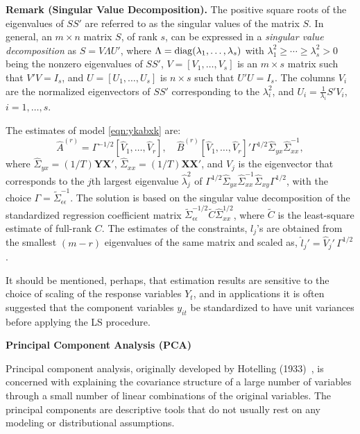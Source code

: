 \noindent\textbf{Remark (Singular Value Decomposition).} The positive square roots of the eigenvalues of $SS'$ are referred to as the singular values of the matrix $S$. In general, an $m \times n$ matrix $S$, of rank $s$, can be expressed in a \emph{singular value decomposition} as $S= V \Lambda U'$, where $\Lambda= \operatorname{diag}(\lambda_1, \ldots, \lambda_s)$ with $\lambda_1^2 \geq \cdots \geq \lambda_s^2 > 0$ being the nonzero eigenvalues of $SS'$, $V= [V_1, \ldots, V_s]$ is an $m \times s$ matrix such that $V' V= I_s$, and $U= [U_1, \ldots, U_s]$ is $n \times s$ such that $U'U= I_s$. The columns $V_i$ are the normalized eigenvectors of $SS'$ corresponding to the $\lambda_i^2$, and $U_i= \frac{1}{\lambda_i}S'V_i$, $i=1, \ldots, s$. \twomedskip


The estimates of model \eqref{eqn:ykabxk} are:
	\begin{equation} \label{eqn:covarmatrixsol}
	\hat{A}^{(r)}= \Gamma^{-1/2} [\hat{V}_1, \ldots, \hat{V}_r], \quad \hat{B}^{(r)}[ \hat{V}_1, \ldots, \hat{V}_r]' \Gamma^{1/2} \hat{\Sigma}_{yx} \hat{\Sigma}_{xx}^{-1},
	\end{equation}
where $\hat{\Sigma}_{yx}= (1/T) \mathbf{Y} \mathbf{X}'$, $\hat{\Sigma}_{xx}= (1/T) \mathbf{X} \mathbf{X}'$, and $\hat{V}_j$ is the eigenvector that corresponds to the $j$th largest eigenvalue $\hat{\lambda}_j^2$ of $\Gamma^{1/2} \hat{\Sigma}_{yx} \hat{\Sigma}_{xx}^{-1} \hat{\Sigma}_{xy}\Gamma^{1/2}$, with the choice $\Gamma= \tilde{\Sigma}_{\epsilon\epsilon}^{-1}$. The solution is based on the singular value decomposition of the standardized regression coefficient matrix $\tilde{\Sigma}_{\epsilon\epsilon}^{-1/2} \tilde{C} \hat{\Sigma}_{xx}^{1/2}$, where $\tilde{C}$ is the least-square estimate of full-rank $C$. The estimates of the constraints, $l_j$'s are obtained from the smallest $(m-r)$ eigenvalues of the same matrix and scaled as, $\hat{l}_j' = \hat{V}_j' \, \Gamma^{1/2}$. 


It should be mentioned, perhaps, that estimation results are sensitive to the choice of scaling of the response variables $Y_t$, and in applications it is often suggested that the component variables $y_{it}$ be standardized to have unit variances before applying the LS procedure. \twomedskip


\noindent\textbf{Principal Component Analysis (PCA)} \label{in:pca} \twomedskip


Principal component analysis, originally developed by Hotelling (1933)~\cite{hotelling33}, is concerned with explaining the covariance structure of a large number of variables through a small number of linear combinations of the original variables. The principal components are descriptive tools that do not usually rest on any modeling or distributional assumptions. 


